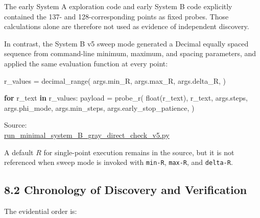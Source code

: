 \documentclass[
  10pt,
  a4paper,
]{article}
\newenvironment{Shaded}{}{}
\newcommand{\BuiltInTok}[1]{\textcolor[rgb]{0.00,0.50,0.00}{#1}}
\newcommand{\ControlFlowTok}[1]{\textcolor[rgb]{0.00,0.44,0.13}{\textbf{#1}}}
\newcommand{\KeywordTok}[1]{\textcolor[rgb]{0.00,0.44,0.13}{\textbf{#1}}}
\newcommand{\NormalTok}[1]{#1}
\newcommand{\OperatorTok}[1]{\textcolor[rgb]{0.40,0.40,0.40}{#1}}
\begin{document}
The early System A exploration code and early System B code explicitly
contained the 137- and 128-corresponding points as fixed probes. Those
calculations alone are therefore not used as evidence of independent
discovery.

In contrast, the System B v5 sweep mode generated a Decimal equally
spaced sequence from command-line minimum, maximum, and spacing
parameters, and applied the same evaluation function at every point:

\begin{Shaded}
\begin{Highlighting}[]
\NormalTok{r\_values }\OperatorTok{=}\NormalTok{ decimal\_range(}
\NormalTok{    args.min\_R,}
\NormalTok{    args.max\_R,}
\NormalTok{    args.delta\_R,}
\NormalTok{)}

\ControlFlowTok{for}\NormalTok{ r\_text }\KeywordTok{in}\NormalTok{ r\_values:}
\NormalTok{    payload }\OperatorTok{=}\NormalTok{ probe\_r(}
        \BuiltInTok{float}\NormalTok{(r\_text),}
\NormalTok{        r\_text,}
\NormalTok{        args.steps,}
\NormalTok{        args.phi\_mode,}
\NormalTok{        args.min\_steps,}
\NormalTok{        args.early\_stop\_patience,}
\NormalTok{    )}
\end{Highlighting}
\end{Shaded}

Source:\\
\href{../20260715/run_minimal_system_B_gray_direct_check_v5.py\#L228-L270}{run\_minimal\_system\_B\_gray\_direct\_check\_v5.py}

A default \(R\) for single-point execution remains in the source, but it
is not referenced when sweep mode is invoked with \texttt{min-R},
\texttt{max-R}, and \texttt{delta-R}.

\subsection{8.2 Chronology of Discovery and
Verification}\label{chronology-of-discovery-and-verification}

The evidential order is:
\end{document}
